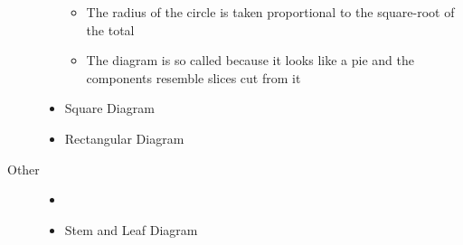 \documentclass[
10pt, %
a4paper, %
]{report}
\begin{document}
\begin{description}
\begin{itemize}
\begin{itemize}
\item The radius of the circle is taken proportional to the square-root of the total
\item The diagram is so called because it looks like a pie and the components resemble slices cut from it
\end{itemize}
\item Square Diagram
\item Rectangular Diagram
\end{itemize}
\item[Other]
\begin{itemize}
\item[]
\item Stem and Leaf Diagram
\end{itemize}
\end{description}
\end{document}
